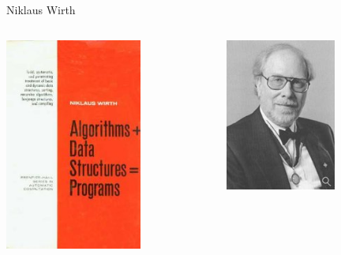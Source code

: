 \documentclass[10pt]{beamer}
\begin{document}
\begin{frame}{Niklaus Wirth}
    \begin{columns}
        \begin{column}{0.6\textwidth}
	        \includegraphics[height=7cm]{images/algorithms_data_structures_programs.jpg}
        \end{column}
        \begin{column}{0.4\textwidth}  %
                \begin{center}
					\includegraphics[height=5cm]{images/wirth.jpg}
                \end{center}
        \end{column}
    \end{columns}
\end{frame}
\end{document}
